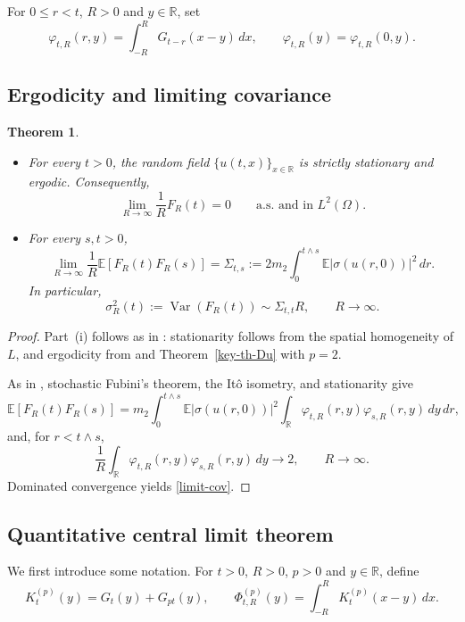 \documentclass[12pt]{article}
\newtheorem{theorem}{Theorem}[section]
\def\bE{\mathbb{E}}
\def\bR{\mathbb{R}}
\begin{document}
For $0\le r<t$, $R>0$ and $y\in\bR$, set
\begin{equation}
\label{def-phi}
\varphi_{t,R}(r,y)
=
\int_{-R}^{R}G_{t-r}(x-y)\,dx,
\qquad
\varphi_{t,R}(y)=\varphi_{t,R}(0,y).
\end{equation}

\subsection{Ergodicity and limiting covariance}
\begin{theorem}
\label{ergodic-cov}
\begin{itemize}
\item[(i)] For every $t>0$, the random field $\{u(t,x)\}_{x\in\bR}$ is
strictly stationary and ergodic. Consequently,
\[
\lim_{R\to\infty}\frac{1}{R}F_R(t)=0
\qquad
\text{a.s. and in }L^2(\Omega).
\]

\item[(ii)] For every $s,t>0$,
\begin{equation}
\label{limit-cov}
\lim_{R\to\infty}
\frac{1}{R}\bE[F_R(t)F_R(s)]
=
\Sigma_{t,s}
:=
2m_2\int_0^{t\wedge s}
\bE\big|\sigma(u(r,0))\big|^2\,dr.
\end{equation}
In particular,
\[
\sigma_R^2(t):=\operatorname{Var}(F_R(t))
\sim
\Sigma_{t,t}R,
\qquad R\to\infty.
\]
\end{itemize}
\end{theorem}

\begin{proof}
 Part~(i) follows as in \cite[Theorem~1.1]{BZ24}: stationarity follows
from the spatial homogeneity of $L$, and ergodicity from
\cite[Lemma~4.2]{BZ24} and Theorem~\ref{key-th-Du} with $p=2$.

As in \cite[proof of Theorem~1.1(ii)]{BLW26}, stochastic Fubini's
theorem, the It\^o isometry, and stationarity give
\[
\bE[F_R(t)F_R(s)]
=
m_2\int_0^{t\wedge s}
\bE|\sigma(u(r,0))|^2
\int_{\bR}
\varphi_{t,R}(r,y)\varphi_{s,R}(r,y)\,dy\,dr,
\]
 and, for $r<t\wedge s$,
\[
\frac1R\int_{\bR}
\varphi_{t,R}(r,y)\varphi_{s,R}(r,y)\,dy
\longrightarrow 2,
\qquad R\to\infty.
\]
Dominated convergence yields \eqref{limit-cov}.
\end{proof}

\subsection{Quantitative central limit theorem}
We first introduce some notation. For \(t>0\), \(R>0\),
\(p>0\) and \(y\in\bR\), define
\[
K_t^{(p)}(y)
=
G_t(y)+G_{pt}(y),
\qquad
\Phi_{t,R}^{(p)}(y)
=
\int_{-R}^{R}K_t^{(p)}(x-y)\,dx .
\]
\end{document}
